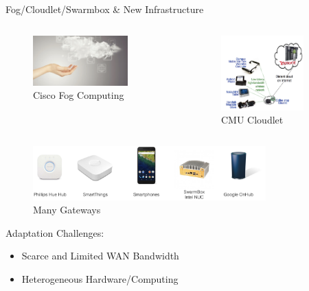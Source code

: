 \begin{frame}{Fog/Cloudlet/Swarmbox \& New Infrastructure}
  \begin{columns}
    \begin{figure}
      \includegraphics[width=0.8\textwidth]{figures/fog.png}
      \captionsetup{labelformat=empty}
      \caption{Cisco Fog Computing}
    \end{figure}
    \pause
    \begin{figure}
      \includegraphics[width=0.8\textwidth]{figures/cloudlet.png}
      \captionsetup{labelformat=empty}
      \caption{CMU Cloudlet}
    \end{figure}
  \end{columns}
  \pause
  \begin{figure}
    \includegraphics[width=0.8\textwidth]{figures/gateways.png}
    \captionsetup{labelformat=empty}
    \caption{Many Gateways}
  \end{figure}
\end{frame}

\begin{frame}{Adaptation}
  Challenges:
  \begin{itemize}
  \item Scarce and Limited WAN Bandwidth
  \item Heterogeneous Hardware/Computing
  \end{itemize}
\end{frame}


